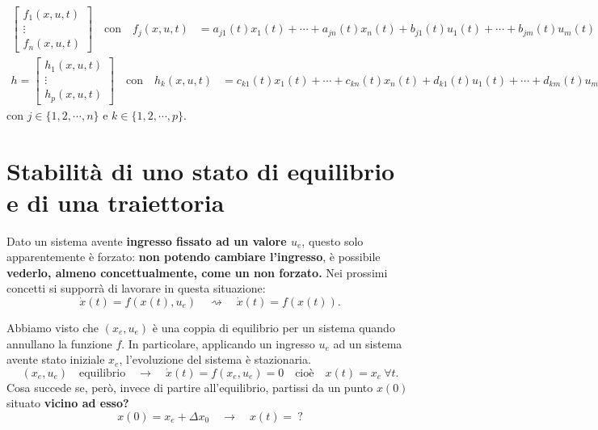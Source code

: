 \documentclass[a4paper]{report}
\begin{document}
\begin{itemize}
\begin{align}
\begin{bmatrix}
		f_1(x, u, t) \\
		\vdots \\
		f_n(x, u, t)
	\end{bmatrix} \quad \textrm{con} \quad f_j(x,u,t) & = a_{j1}(t)x_1(t) + \cdots + a_{jn}(t)x_n(t) + b_{j1}(t)u_1(t) + \cdots + b_{jm}(t)u_m(t)
\end{align}
\begin{align}
\label{h_lineare}
		h = \begin{bmatrix}
		h_1(x, u, t) \\
		\vdots \\
		h_p(x, u, t)
	\end{bmatrix} \quad \textrm{con} \quad h_k(x,u,t) & = c_{k1}(t)x_1(t) + \cdots + c_{kn}(t)x_n(t) + d_{k1}(t)u_1(t) + \cdots + d_{km}(t)u_m(t)
\end{align}
con $j \in \{1,2, \cdots, n\}$ e $k \in \{1,2, \cdots, p\}$.
\end{itemize} 


\section{Stabilità di uno stato di equilibrio e di una traiettoria}
\begin{prop}
Dato un sistema avente \textbf{ingresso fissato ad un valore $u_e$},
questo solo apparentemente è forzato: \textbf{non potendo cambiare l'ingresso}, è possibile \textbf{vederlo, almeno concettualmente, come un non forzato.} Nei prossimi concetti si supporrà di lavorare in questa situazione:
\begin{equation*}
	\dot x(t) = f(x(t), u_e) \quad \rightsquigarrow \quad  \dot x(t) = f(x(t)).
\end{equation*}
\end{prop}
Abbiamo visto che $(x_e, u_e)$ è una coppia di equilibrio per un sistema quando annullano la funzione $f$. In particolare, applicando un ingresso $u_e$ ad un sistema avente stato iniziale $x_e$, l'evoluzione del sistema è stazionaria.
\begin{equation*}
	(x_e, u_e) \quad  \textrm{equilibrio} \quad \rightarrow \quad \dot x(t) = f(x_e, u_e) = 0 \quad \textrm{cioè} \quad x(t) = x_e \ \forall t.
\end{equation*} Cosa succede se, però, invece di partire all'equilibrio, partissi da un punto $x(0)$ situato \textbf{vicino ad esso?} 
\begin{equation*}
	 \boxed{x(0)=x_e+\Delta x_0} \quad \rightarrow \quad  x(t) = \ ?
\end{equation*}
\end{document}
